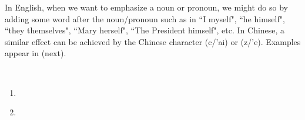 In English, when we want to emphasize a noun or pronoun,
we might do so by adding some word after the noun/pronoun such as in
``I myself", ``he himself", ``they themselves", ``Mary herself", ``The President himself", etc.
In Chinese, a similar effect can be achieved by the Chinese character
 (c/'ai) or  (z/'e).
Examples appear in  (next).
\begin{example}
\mbox{}\\
\label{ex:cai}
\begin{enumerate}
  \item {}%
        \zhtsX%

  \item {}%
        \zhtsP%
        \\
\end{enumerate}
\end{example}


